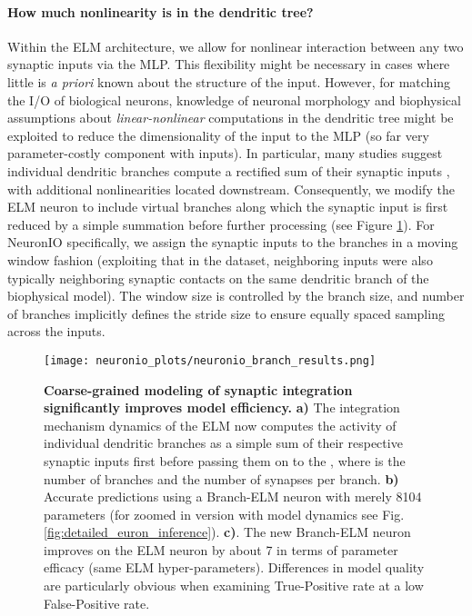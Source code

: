 \documentclass{article} \usepackage{iclr2024_doc_style,times}
\begin{document}
\paragraph{How much nonlinearity is in the dendritic tree?}
Within the \textcolor{blueVar}{ELM} architecture, we allow for nonlinear interaction between any two synaptic inputs via the MLP. This flexibility might be necessary in cases where little is \emph{a priori} known about the structure of the input. However, for matching the I/O of biological neurons, knowledge of neuronal morphology and biophysical assumptions about \textit{linear-nonlinear} computations in the dendritic tree might be exploited to reduce the dimensionality of the input to the MLP (so far very parameter-costly component with  inputs). In particular, many studies suggest individual dendritic branches compute a rectified sum of their synaptic inputs \cite{poirazi2003pyramidal,stuart2015dendritic,hawkins2016neurons,poirazi2020illuminating}, with additional nonlinearities located downstream. Consequently, we modify the ELM neuron to include virtual branches along which the synaptic input is first reduced by a simple summation before further processing (see Figure \ref{fig:neuronio_model_and_results_branch}). For NeuronIO specifically, we assign the synaptic inputs to the branches in a moving window fashion (exploiting that in the dataset, neighboring inputs were also typically neighboring synaptic contacts on the same dendritic branch of the biophysical model). The window size is controlled by the branch size, and number of branches implicitly defines the stride size to ensure equally spaced sampling across the  inputs.

\begin{figure}[t]
\centering
    \centering
    \texttt{[image: neuronio\_plots/neuronio\_branch\_results.png]}
    \caption{\textbf{Coarse-grained modeling of synaptic integration significantly improves model efficiency.} \textbf{a)} The \textcolor{orangeVar}{integration mechanism dynamics} of the ELM now computes the activity of individual dendritic branches as a simple sum of their respective synaptic inputs first before passing them on to the , where  is the number of branches and  the number of synapses per branch. \textbf{b)} Accurate predictions using a \textcolor{lightblueVar}{Branch-ELM} neuron with merely 8104 parameters (for zoomed in version with model dynamics see Fig. \ref{fig:detailed_euron_inference}). \textbf{c)}. The new \textcolor{lightblueVar}{Branch-ELM} neuron improves on the \textcolor{blueVar}{ELM} neuron by about 7 in terms of parameter efficacy (same \textcolor{blueVar}{ELM} hyper-parameters). Differences in model quality are particularly obvious when examining True-Positive rate at a low False-Positive rate.}
    \label{fig:neuronio_model_and_results_branch}
\end{figure}
\end{document}
